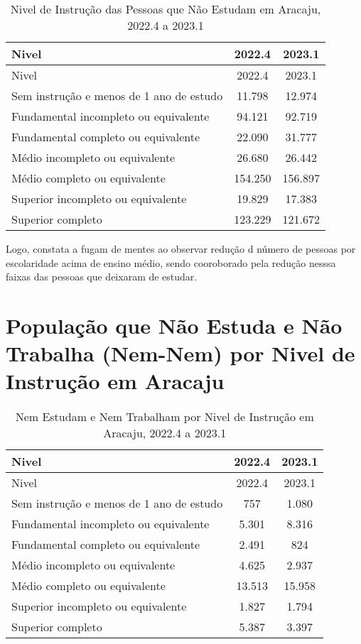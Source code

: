 \begin{longtable}[]{@{}lcc@{}}
\caption{\label{tab6}Nivel de Instrução das Pessoas que Não Estudam em
Aracaju, 2022.4 a 2023.1}\tabularnewline
\toprule\noalign{}
Nivel & 2022.4 & 2023.1 \\
\midrule\noalign{}
\endfirsthead
\toprule\noalign{}
Nivel & 2022.4 & 2023.1 \\
\midrule\noalign{}
\endhead
\bottomrule\noalign{}
\endlastfoot
Sem instrução e menos de 1 ano de estudo & 11.798 & 12.974 \\
Fundamental incompleto ou equivalente & 94.121 & 92.719 \\
Fundamental completo ou equivalente & 22.090 & 31.777 \\
Médio incompleto ou equivalente & 26.680 & 26.442 \\
Médio completo ou equivalente & 154.250 & 156.897 \\
Superior incompleto ou equivalente & 19.829 & 17.383 \\
Superior completo & 123.229 & 121.672 \\
\end{longtable}

Logo, constata a fugam de mentes ao observar redução d número de pessoas
por escolaridade acima de ensino médio, sendo cooroborado pela redução
nesssa faixas das pessoas que deixaram de estudar.

\hypertarget{populauxe7uxe3o-que-nuxe3o-estuda-e-nuxe3o-trabalha-nem-nem-por-nivel-de-instruuxe7uxe3o-em-aracaju}{%
\section{População que Não Estuda e Não Trabalha (Nem-Nem) por Nivel de
Instrução em
Aracaju}\label{populauxe7uxe3o-que-nuxe3o-estuda-e-nuxe3o-trabalha-nem-nem-por-nivel-de-instruuxe7uxe3o-em-aracaju}}

\begin{longtable}[]{@{}lcc@{}}
\caption{\label{tab7}Nem Estudam e Nem Trabalham por Nivel de Instrução
em Aracaju, 2022.4 a 2023.1}\tabularnewline
\toprule\noalign{}
Nivel & 2022.4 & 2023.1 \\
\midrule\noalign{}
\endfirsthead
\toprule\noalign{}
Nivel & 2022.4 & 2023.1 \\
\midrule\noalign{}
\endhead
\bottomrule\noalign{}
\endlastfoot
Sem instrução e menos de 1 ano de estudo & 757 & 1.080 \\
Fundamental incompleto ou equivalente & 5.301 & 8.316 \\
Fundamental completo ou equivalente & 2.491 & 824 \\
Médio incompleto ou equivalente & 4.625 & 2.937 \\
Médio completo ou equivalente & 13.513 & 15.958 \\
Superior incompleto ou equivalente & 1.827 & 1.794 \\
Superior completo & 5.387 & 3.397 \\
\end{longtable}

